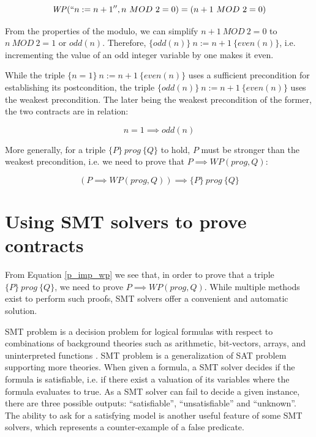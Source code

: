 \documentclass{kththesis}
\newcommand{\htriple}[3]{\ensuremath{\{#1\}~#2~\{#3\}}}
\newcommand{\WP}{\ensuremath{\mathit{WP}}}
\begin{document}
{\begin{equation}
  \WP(``n:=n+1'',n~MOD~2 = 0)=(n+1~MOD~2 = 0)
  \label{wp_comp_n_inc_even}
\end{equation}

From the properties of the modulo, we can simplify $n+1~MOD~2 = 0$ to $n~MOD~2 = 1$ or $odd(n)$. Therefore, \htriple{odd(n)}{n:=n+1}{even(n)}, i.e. incrementing the value of an odd integer variable by one makes it even.

While the triple \htriple{n=1}{n:=n+1}{even(n)} uses a sufficient precondition for establishing its postcondition, the triple \htriple{odd(n)}{n:=n+1}{even(n)} uses the weakest precondition. The later being the weakest precondition of the former, the two contracts are in relation:

\begin{equation}
  n=1 \implies odd(n)
\end{equation}

More generally, for a triple \htriple{P}{prog}{Q} to hold, $P$ must be stronger than the weakest precondition, i.e. we need to prove that $P \implies \WP(prog, Q)$:


\begin{equation}
  (P \implies \WP(prog, Q)) \implies \htriple{P}{prog}{Q}
  \label{p_imp_wp}
\end{equation}

\section{Using SMT solvers to prove contracts} \label{using-smt-to-prove-contracts}

From Equation \ref{p_imp_wp} we see that, in order to prove that a triple \htriple{P}{prog}{Q}, we need to prove $P \implies \WP(prog, Q)$. While multiple methods exist to perform such proofs, \acrshort{SMT} solvers offer a convenient and automatic solution.

\gls{SMT} problem is a decision problem for logical formulas with respect to combinations of background theories such as arithmetic, bit-vectors, arrays, and uninterpreted functions \cite{nikolaj_bjorner_programming_2019}. {SMT} problem is a generalization of \gls{SAT} problem supporting more theories. When given a formula, a {SMT} solver decides if the formula is satisfiable, i.e. if there exist a valuation of its variables where the formula evaluates to true. As a {SMT} solver can fail to decide a given instance, there are three possible outputs: ``satisfiable'', ``unsatisfiable'' and ``unknown''. The ability to ask for a satisfying model is another useful feature of some {SMT} solvers, which represents a counter-example of a false predicate.

}
\end{document}
